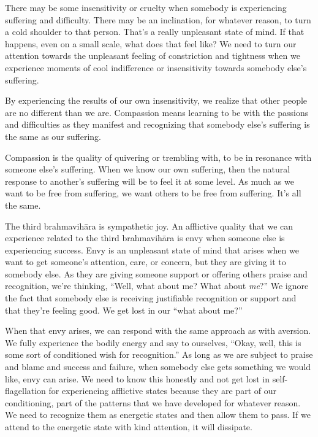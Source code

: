 There may be some insensitivity or cruelty when somebody is experiencing suffering and difficulty. There may be an inclination, for whatever reason, to turn a cold shoulder to that person. That's a really unpleasant state of mind. If that happens, even on a small scale, what does that feel like? We need to turn our attention towards the unpleasant feeling of constriction and tightness when we experience moments of cool indifference or insensitivity towards somebody else's suffering.

By experiencing the results of our own insensitivity, we realize that other people are no different than we are. Compassion means learning to be with the passions and difficulties as they manifest and recognizing that somebody else's suffering is the same as our suffering.

Compassion is the quality of quivering or trembling with, to be in resonance with someone else's suffering. When we know our own suffering, then the natural response to another's suffering will be to feel it at some level. As much as we want to be free from suffering, we want others to be free from suffering. It's all the same.~

The third brahmavihāra is sympathetic joy. An afflictive quality that we can experience related to the third brahmavihāra is envy when someone else is experiencing success. Envy is an unpleasant state of mind that arises when we want to get someone's attention, care, or concern, but they are giving it to somebody else. As they are giving someone support or offering others praise and recognition, we're thinking, ``Well, what about me? What about \emph{me}?'' We ignore the fact that somebody else is receiving justifiable recognition or support and that they're feeling good. We get lost in our ``what about me?''~

When that envy arises, we can respond with the same approach as with aversion. We fully experience the bodily energy and say to ourselves, ``Okay, well, this is some sort of conditioned wish for recognition.'' As long as we are subject to praise and blame and success and failure, when somebody else gets something we would like, envy can arise. We need to know this honestly and not get lost in self-flagellation for experiencing afflictive states because they are part of our conditioning, part of the patterns that we have developed for whatever reason. We need to recognize them as energetic states and then allow them to pass. If we attend to the energetic state with kind attention, it will dissipate.~

